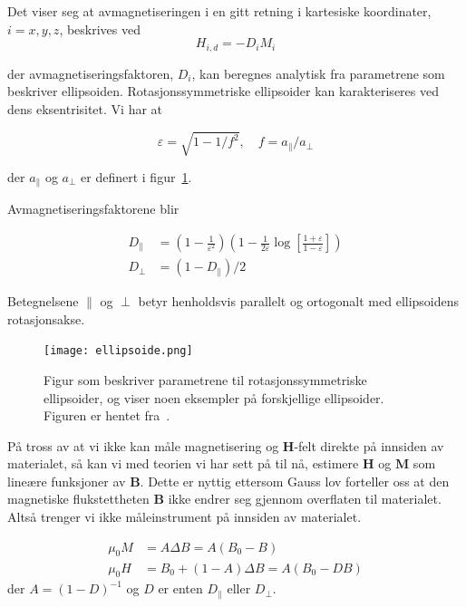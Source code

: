\documentclass[a4paper,11pt, twocolumn]{article}
\begin{document}
Det viser seg at avmagnetiseringen i en gitt retning i kartesiske koordinater, $i = x,y,z$, beskrives ved 
\begin{equation}
	H_{i,d}=-D_iM_i
	\label{eq:Hi}
\end{equation}

der avmagnetiseringsfaktoren, $D_i$, kan beregnes analytisk fra parametrene som beskriver ellipsoiden.
Rotasjonssymmetriske ellipsoider kan karakteriseres ved dens eksentrisitet. Vi har at 

\begin{equation}
	\varepsilon = \sqrt{1-1/f^2}, \quad f = a_{\parallel}/a_{\perp}
	\label{eq:eksentrisitet}
\end{equation}

der $a_{\parallel}$ og $a_\perp$ er definert i figur~\ref{fig:ellipsoide}.

Avmagnetiseringsfaktorene blir 

\begin{align}
	D_\parallel &= \left( 1-\frac{1}{\varepsilon^2} \right)\left( 1-\frac{1}{2\varepsilon}\log\left[ \frac{1+\varepsilon}{1-\varepsilon} \right] \right)\\
	D_\perp &= (1-D_\parallel)/2
	\label{eq:avmagnetisering}
\end{align}

Betegnelsene $\parallel$ og $\perp$ betyr henholdsvis parallelt og ortogonalt med ellipsoidens rotasjonsakse.
\begin{figure}[!ht]
	\centering
	\texttt{[image: ellipsoide.png]}
	\caption{Figur som beskriver parametrene til rotasjonssymmetriske ellipsoider, og viser noen eksempler på forskjellige ellipsoider. Figuren er hentet fra~\cite{oppgavesett}.}
	\label{fig:ellipsoide}
\end{figure}

På tross av at vi ikke kan måle magnetisering og $\mathbf H$-felt direkte på innsiden av materialet, så kan vi med teorien vi har sett på til nå, estimere $\mathbf H$ og $\mathbf M$ som lineære funksjoner av $\mathbf B$. Dette er nyttig ettersom Gauss lov forteller oss at den magnetiske flukstettheten $\mathbf B$ ikke endrer seg gjennom overflaten til materialet. Altså trenger vi ikke måleinstrument på innsiden av materialet. 

\begin{align}
	\mu_0 M &= A\Delta B = A(B_0-B)\\
	\mu_0 H &= B_0 + (1-A)\Delta B = A(B_0-DB) 
	\label{eq:1}
\end{align}
der $A = (1-D)^{-1}$ og $D$ er enten $D_\parallel$ eller $D_\perp$.
\end{document}
